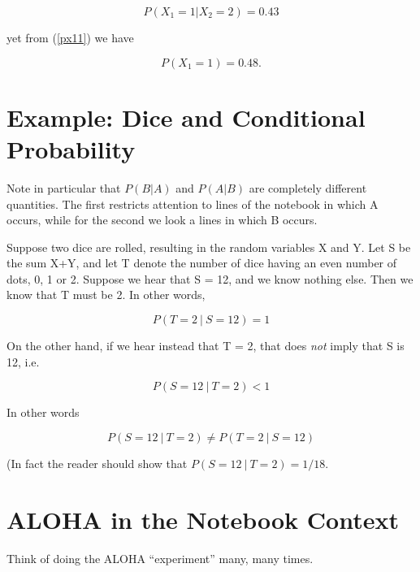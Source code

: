 \begin{equation}
P(X_1 = 1 | X_2 = 2) = 0.43
\end{equation}

yet from (\ref{px11}) we have

\begin{equation}
P(X_1 = 1) = 0.48.
\end{equation}

\section{Example: Dice and Conditional Probability}

Note in particular that $P(B | A)$ and $P(A | B)$ are completely
different quantities.  The first restricts attention to lines of the
notebook in which A occurs, while for the second we look a lines in
which B occurs.

Suppose two dice are rolled, resulting in the random variables X and Y.
Let S be the sum X+Y, and let T denote the number of dice having an
even number of dots, 0, 1 or 2.  Suppose we hear that S = 12, and we know
nothing else.  Then we know that T must be 2.  In other words,

\begin{equation}
P(T = 2 ~|~ S = 12) = 1
\end{equation}

On the other hand, if we hear instead that T = 2, that does {\it not}
imply that S is 12, i.e.

\begin{equation}
P(S = 12 ~|~ T = 2) < 1
\end{equation}

In other words

\begin{equation}
P(S = 12 ~|~ T = 2) \neq
P(T = 2 ~|~ S = 12)
\end{equation}

(In fact the reader should show that $P(S = 12 ~|~ T = 2) = 1/18$.

\section{ALOHA in the Notebook Context}

Think of doing the ALOHA ``experiment'' many, many times.

